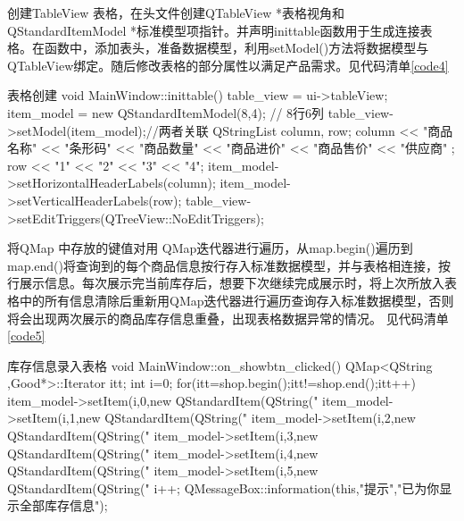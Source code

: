 \documentclass[
   projtype=report, %
   output=print,     %
  ]{nwafuprojrep}
\begin{document}
创建TableView 表格，在头文件创建QTableView *表格视角和 QStandardItemModel *标准模型项指针。并声明inittable函数用于生成连接表格。在函数中，添加表头，准备数据模型，利用setModel()方法将数据模型与QTableView绑定。随后修改表格的部分属性以满足产品需求。见代码清单\ref{code4}
\begin{langCVOne}[C++][code4][QT]{表格创建}
void MainWindow::inittable()
{
    table_view = ui->tableView;
    item_model = new QStandardItemModel(8,4);  // 8行6列
    table_view->setModel(item_model);//两者关联
    QStringList column, row;
    column << "商品名称" << "条形码" << "商品数量" << "商品进价" << "商品售价"  << "供应商" ;
    row << "1" << "2" << "3" << "4";
    item_model->setHorizontalHeaderLabels(column);                
    item_model->setVerticalHeaderLabels(row);
    table_view->setEditTriggers(QTreeView::NoEditTriggers); 
}
\end{langCVOne}
将QMap 中存放的键值对用 QMap迭代器进行遍历，从map.begin()遍历到map.end()将查询到的每个商品信息按行存入标准数据模型，并与表格相连接，按行展示信息。每次展示完当前库存后，想要下次继续完成展示时，将上次所放入表格中的所有信息清除后重新用QMap迭代器进行遍历查询存入标准数据模型，否则将会出现两次展示的商品库存信息重叠，出现表格数据异常的情况。
见代码清单\ref{code5}
\begin{langCVOne}[C++][code5][QT]{库存信息录入表格}
void MainWindow::on_showbtn_clicked()
{
    QMap<QString ,Good*>::Iterator itt;
    int i=0;
    for(itt=shop.begin();itt!=shop.end();itt++)
    {
        item_model->setItem(i,0,new QStandardItem(QString("%
        item_model->setItem(i,1,new QStandardItem(QString("%
        item_model->setItem(i,2,new QStandardItem(QString("%
        item_model->setItem(i,3,new QStandardItem(QString("%
        item_model->setItem(i,4,new QStandardItem(QString("%
        item_model->setItem(i,5,new QStandardItem(QString("%
    i++;
    }
    QMessageBox::information(this,"提示","已为你显示全部库存信息");
}
\end{langCVOne}
\end{document}
